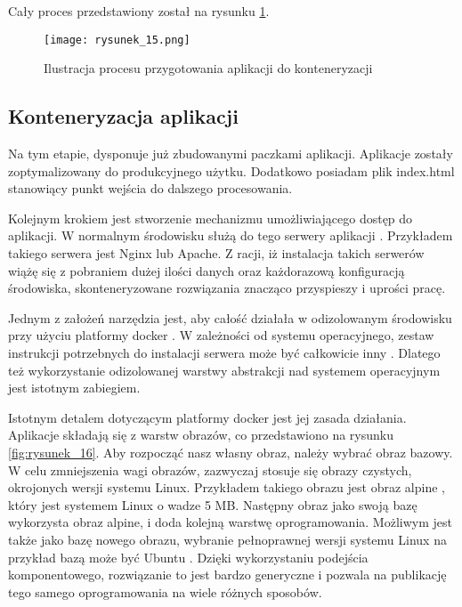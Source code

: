 Cały proces przedstawiony został na rysunku \ref{fig:rysunek_15}.

\begin{figure}[!ht]
    \centering
    \texttt{[image: rysunek\_15.png]}
    \caption{Ilustracja procesu przygotowania aplikacji do konteneryzacji}
    \label{fig:rysunek_15}
\end{figure}

\subsection{Konteneryzacja aplikacji}

Na tym etapie, dysponuje już zbudowanymi paczkami aplikacji. Aplikacje zostały zoptymalizowany do produkcyjnego użytku. Dodatkowo posiadam plik index.html stanowiący punkt wejścia do dalszego procesowania.

Kolejnym krokiem jest stworzenie mechanizmu umożliwiającego dostęp do aplikacji. W normalnym środowisku służą do tego serwery aplikacji \cite{web-server}. Przykładem takiego serwera jest Nginx lub Apache.
Z racji, iż instalacja takich serwerów wiążę się z pobraniem dużej ilości danych oraz każdorazową konfiguracją środowiska, skonteneryzowane rozwiązania znacząco przyspieszy i uprości pracę.

Jednym z założeń narzędzia jest, aby całość działała w odizolowanym środowisku przy użyciu platformy docker \cite{docker}. W zależności od systemu operacyjnego, zestaw instrukcji potrzebnych do instalacji serwera może być całkowicie inny \cite{nginx-windows}\cite{nginx-linux}.
Dlatego też wykorzystanie odizolowanej warstwy abstrakcji nad systemem operacyjnym jest istotnym zabiegiem.

Istotnym detalem dotyczącym platformy docker jest jej zasada działania. Aplikacje składają się z warstw obrazów, co przedstawiono na rysunku \ref{fig:rysunek_16}.
Aby rozpocząć nasz własny obraz, należy wybrać obraz bazowy. W celu zmniejszenia wagi obrazów, zazwyczaj stosuje się obrazy czystych, okrojonych wersji systemu Linux.
Przykładem takiego obrazu jest obraz alpine \cite{docker-alpine}, który jest systemem Linux o wadze 5 MB. Następny obraz jako swoją bazę wykorzysta obraz alpine, i doda kolejną warstwę oprogramowania.
Możliwym jest także jako bazę nowego obrazu, wybranie pełnoprawnej wersji systemu Linux na przykład bazą może być Ubuntu \cite{ubuntu}.
Dzięki wykorzystaniu podejścia komponentowego, rozwiązanie to jest bardzo generyczne i pozwala na publikację tego samego oprogramowania na wiele różnych sposobów.

